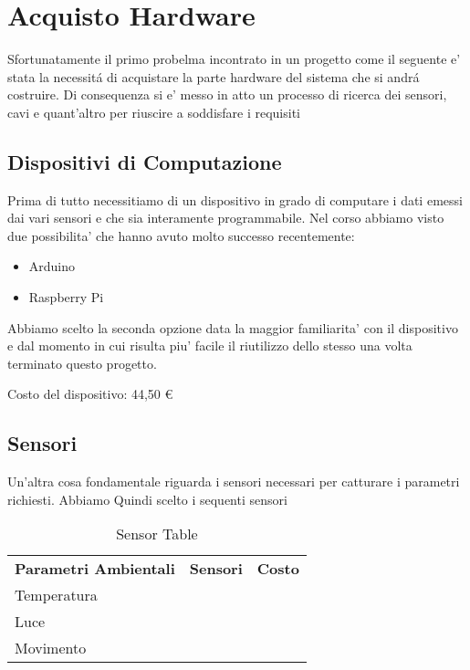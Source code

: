 \section{Acquisto Hardware}

Sfortunatamente il primo probelma incontrato in un progetto come il seguente e' stata la necessit\'a di acquistare la parte hardware del sistema che si andr\' a costruire. Di consequenza si e' messo in atto un processo di ricerca dei sensori, cavi e quant'altro per riuscire a soddisfare i requisiti

\subsection{Dispositivi di Computazione}

Prima di tutto necessitiamo di un dispositivo in grado di computare i dati emessi dai vari sensori e che sia interamente programmabile. Nel corso abbiamo visto due possibilita' che hanno avuto molto successo recentemente:

\begin{itemize}
  \item Arduino
  \item Raspberry Pi
\end{itemize}

Abbiamo scelto la seconda opzione data la maggior familiarita' con il dispositivo e dal momento in cui risulta piu' facile il riutilizzo dello stesso una volta terminato questo progetto.

Costo del dispositivo: 44,50 \euro

\subsection{Sensori}

Un'altra cosa fondamentale riguarda i sensori necessari per catturare i parametri richiesti. Abbiamo Quindi scelto i sequenti sensori

\begin{table}[]
\centering
\begin{tabular}{lll}
\cline{1-1}
\multicolumn{1}{|c|}{\textbf{Parametri Ambientali}} & \multicolumn{1}{c}{\textbf{Sensori}} & \multicolumn{1}{c}{\textbf{Costo}} \\ \cline{1-1}
Temperatura                               &                                     &                                   \\
Luce                                      &                                     &                                   \\
Movimento                                 &                                     &                                
\end{tabular}
\caption{Sensor Table}
\label{Sensor Table}
\end{table}

